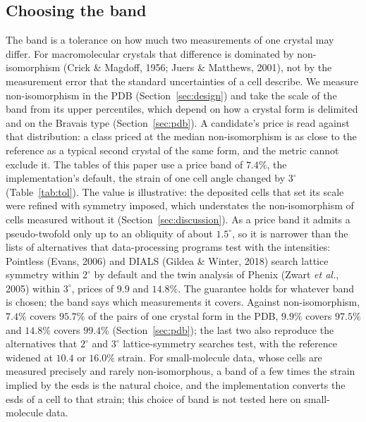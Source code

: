 \subsection{Choosing the band}
\label{sec:band}
The band is a tolerance on how much two measurements of one crystal may differ. For macromolecular crystals that difference is dominated by non-isomorphism (Crick \& Magdoff, 1956; Juers \& Matthews, 2001), not by the measurement error that the standard uncertainties of a cell describe. We measure non-isomorphism in the PDB (Section~\ref{sec:design}) and take the scale of the band from its upper percentiles, which depend on how a crystal form is delimited and on the Bravais type (Section~\ref{sec:pdb}). A candidate's price is read against that distribution: a class priced at the median non-isomorphism is as close to the reference as a typical second crystal of the same form, and the metric cannot exclude it. The tables of this paper use a price band of $7.4\%$, the implementation's default, the strain of one cell angle changed by $3^\circ$ (Table~\ref{tab:tol}). The value is illustrative: the deposited cells that set its scale were refined with symmetry imposed, which understates the non-isomorphism of cells measured without it (Section~\ref{sec:discussion}). As a price band it admits a pseudo-twofold only up to an obliquity of about $1.5^\circ$, so it is narrower than the lists of alternatives that data-processing programs test with the intensities: Pointless (Evans, 2006) and DIALS (Gildea \& Winter, 2018) search lattice symmetry within $2^\circ$ by default and the twin analysis of Phenix (Zwart \emph{et al.}, 2005) within $3^\circ$, prices of $9.9$ and $14.8\%$. The guarantee holds for whatever band is chosen; the band says which measurements it covers. Against non-isomorphism, $7.4\%$ covers $95.7\%$ of the pairs of one crystal form in the PDB, $9.9\%$ covers $97.5\%$ and $14.8\%$ covers $99.4\%$ (Section~\ref{sec:pdb}); the last two also reproduce the alternatives that $2^\circ$ and $3^\circ$ lattice-symmetry searches test, with the reference widened at $10.4$ or $16.0\%$ strain. For small-molecule data, whose cells are measured precisely and rarely non-isomorphous, a band of a few times the strain implied by the esds is the natural choice, and the implementation converts the esds of a cell to that strain; this choice of band is not tested here on small-molecule data.

